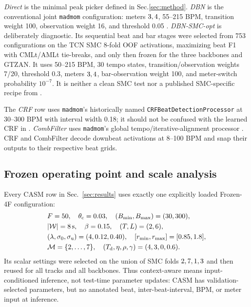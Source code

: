 \documentclass{article}
\begin{document}
\emph{Direct} is the minimal peak picker defined in Sec.\~\ref{sec:method}. \emph{DBN} is the conventional joint \texttt{madmom} configuration: meters $\\{3,4\\}$, 55--215 BPM, transition weight 100, observation weight 16, and threshold 0.05 \cite{krebs2015dbn}. \emph{DBN-SMC-opt} is deliberately diagnostic. Its sequential beat and bar stages were selected from 753 configurations on the TCN SMC 8-fold OOF activations, maximizing beat F1 with CMLt/AMLt tie-breaks, and only then frozen for the three backbones and GTZAN. It uses 50--215 BPM, 30 tempo states, transition/observation weights 7/20, threshold 0.3, meters $\\{3,4\\}$, bar-observation weight 100, and meter-switch probability $10^{-7}$. It is neither a clean SMC test nor a published SMC-specific recipe from \cite{bock2020deconstruct}.

The \emph{CRF} row uses \texttt{madmom}'s historically named \texttt{CRFBeatDetectionProcessor} \cite{korzeniowski2014crf} at 30--300 BPM with interval width 0.18; it should not be confused with the learned CRF in \cite{fillon2015crf}. \emph{CombFilter} uses \texttt{madmom}'s global tempo/iterative-alignment processor \cite{bock2015combfilter}. CRF and CombFilter decode downbeat activations at 8--100 BPM and snap their outputs to their respective beat grids.

\subsection{Frozen operating point and scale analysis}
Every CASM row in Sec.~\ref{sec:results} uses exactly one explicitly loaded
Frozen-4F configuration:
\[
\begin{split}
&F=50,\quad \theta_{\mathrm c}=0.03,\quad
(B_{\min},B_{\max})=(30,300),\\
&|\mathcal W|=8{\rm\,s},\quad \beta=0.15,\quad
(T,L)=(2,6),\\
&(\lambda,\sigma_0,\sigma_{\mathrm u})=(4,0.12,0.40),\quad
[r_{\min},r_{\max}]=[0.85,1.8],\\
&\mathcal M=\{2,\ldots,7\},\quad
(T_{\mathrm d},\eta,\rho,\gamma)=(4,3,0,0.6).
\end{split}
\]
Its scalar settings were selected on the union of SMC folds $\\{2,7,1,3\\}$ and then reused for all tracks and all backbones. Thus context-aware means input-conditioned inference, not test-time parameter updates: CASM has validation-selected parameters, but no annotated beat, inter-beat-interval, BPM, or meter input at inference.
\end{document}
